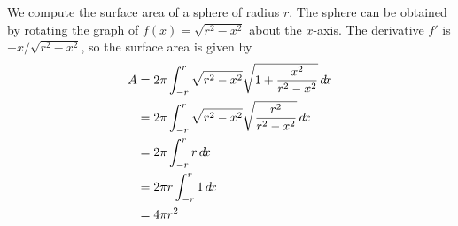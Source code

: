 \documentclass{ximera}
\begin{document}

\begin{example}
  We compute the surface area of a sphere of radius $r$.  The sphere
  can be obtained by rotating the graph of $f(x)=\sqrt{r^2 - x^2}$
  about the $x$-axis.  The derivative $f'$ is $-x/\sqrt{r^2-x^2}$,
  so the surface area is given by
  \begin{align*}
    A&=2\pi \int_{-r }^r \sqrt{r^2 - x^2}\sqrt{1+\frac{x^2}{r^2-x^2}}\d x \\
    &=2\pi \int_{-r }^r \sqrt{r^2 - x^2}\sqrt{\frac{r^2}{r^2-x^2}}\d x \\
    &=2\pi \int_{-r }^r r\d x\\
    &=2\pi r\int_{-r }^r 1\d x\\
    &=4\pi r^2
  \end{align*}
\end{example}
\end{document}
